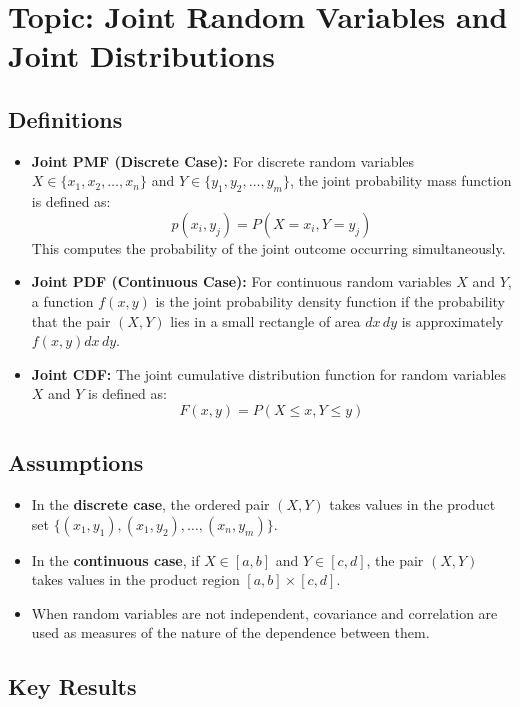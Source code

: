 \documentclass{article}
\begin{document}
\section*{Topic: Joint Random Variables and Joint Distributions}

\subsection*{Definitions}

\begin{itemize}
    \item \textbf{Joint PMF (Discrete Case):} For discrete random variables $X \in \{x_1, x_2, \dots, x_n\}$ and $Y \in \{y_1, y_2, \dots, y_m\}$, the joint probability mass function is defined as:
    \[ p(x_i, y_j) = P(X = x_i, Y = y_j) \]
    This computes the probability of the joint outcome occurring simultaneously.

    \item \textbf{Joint PDF (Continuous Case):} For continuous random variables $X$ and $Y$, a function $f(x,y)$ is the joint probability density function if the probability that the pair $(X,Y)$ lies in a small rectangle of area $dx\,dy$ is approximately $f(x,y)dx\,dy$.

    \item \textbf{Joint CDF:} The joint cumulative distribution function for random variables $X$ and $Y$ is defined as:
    \[ F(x,y) = P(X \le x, Y \le y) \]
\end{itemize}

\subsection*{Assumptions}
\begin{itemize}
    \item In the \textbf{discrete case}, the ordered pair $(X, Y)$ takes values in the product set $\{(x_1, y_1), (x_1, y_2), \dots, (x_n, y_m)\}$.
    \item In the \textbf{continuous case}, if $X \in [a,b]$ and $Y \in [c,d]$, the pair $(X, Y)$ takes values in the product region $[a,b] \times [c,d]$.
    \item When random variables are not independent, covariance and correlation are used as measures of the nature of the dependence between them.
\end{itemize}

\subsection*{Key Results}
\end{document}
